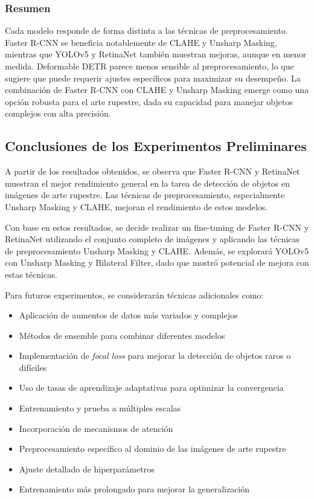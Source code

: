 \subsubsection*{Resumen}
Cada modelo responde de forma distinta a las técnicas de preprocesamiento. Faster R-CNN se beneficia notablemente de CLAHE y Unsharp Masking, mientras que YOLOv5 y RetinaNet también muestran mejoras, aunque en menor medida.
Deformable DETR parece menos sensible al preprocesamiento, lo que sugiere que puede requerir ajustes específicos para maximizar su desempeño.
La combinación de Faster R-CNN con CLAHE y Unsharp Masking emerge como una opción robusta para el arte rupestre, dada su capacidad para manejar objetos complejos con alta precisión.

\subsection{Conclusiones de los Experimentos Preliminares}
A partir de los resultados obtenidos, se observa que Faster R-CNN y RetinaNet muestran el mejor rendimiento general en la tarea de detección de objetos en imágenes de arte rupestre.
Las técnicas de preprocesamiento, especialmente Unsharp Masking y CLAHE, mejoran el rendimiento de estos modelos.

Con base en estos resultados, se decide realizar un fine-tuning de Faster R-CNN y RetinaNet utilizando el conjunto completo de imágenes y aplicando las técnicas de preprocesamiento Unsharp Masking y CLAHE.
Además, se explorará YOLOv5 con Unsharp Masking y Bilateral Filter, dado que mostró potencial de mejora con estas técnicas.

Para futuros experimentos, se considerarán técnicas adicionales como:
\begin{itemize}
    \item Aplicación de aumentos de datos más variados y complejos
    \item Métodos de ensemble para combinar diferentes modelos
    \item Implementación de \textit{focal loss} para mejorar la detección de objetos raros o difíciles
    \item Uso de tasas de aprendizaje adaptativas para optimizar la convergencia
    \item Entrenamiento y prueba a múltiples escalas
    \item Incorporación de mecanismos de atención
    \item Preprocesamiento específico al dominio de las imágenes de arte rupestre
    \item Ajuste detallado de hiperparámetros
    \item Entrenamiento más prolongado para mejorar la generalización
\end{itemize}


